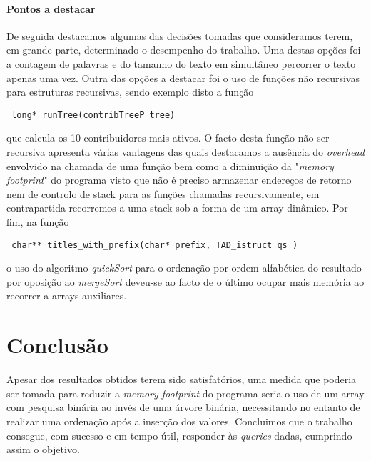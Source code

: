 \documentclass{report}
\begin{document}
\subsection{Pontos a destacar}
De seguida destacamos algumas das decisões tomadas que consideramos terem, em grande parte, determinado o desempenho do trabalho.
Uma destas opções foi a contagem de palavras e do tamanho do texto em simultâneo percorrer o texto apenas uma vez.
Outra das opções a destacar foi o uso de funções não recursivas para estruturas recursivas, sendo exemplo disto a função \begin{verbatim} long* runTree(contribTreeP tree) \end{verbatim} que calcula os 10 contribuidores mais ativos. O facto desta função não ser recursiva apresenta várias vantagens das quais destacamos a ausência do \textit{overhead} envolvido na chamada de uma função bem como a diminuição da "\textit{memory footprint}" do programa visto que não é preciso armazenar endereços de retorno nem de controlo de stack para as funções chamadas recursivamente, em contrapartida recorremos a uma stack sob a forma de um array dinâmico.
Por fim, na função \begin{verbatim} char** titles_with_prefix(char* prefix, TAD_istruct qs ) \end{verbatim} o uso do algoritmo \textit{quickSort} para o ordenação por ordem alfabética do resultado por oposição ao \textit{mergeSort} deveu-se ao facto de o último ocupar mais memória ao recorrer a arrays auxiliares.

\part{Conclusão}
Apesar dos resultados obtidos terem sido satisfatórios, uma medida que poderia ser tomada para reduzir a \textit{memory footprint} do programa seria o uso de um array com pesquisa binária ao invés de uma árvore binária, necessitando no entanto de realizar uma ordenação após a inserção dos valores.
Concluimos que o trabalho consegue, com sucesso e em tempo útil, responder às \textit{queries} dadas, cumprindo assim o objetivo.
\end{document}
